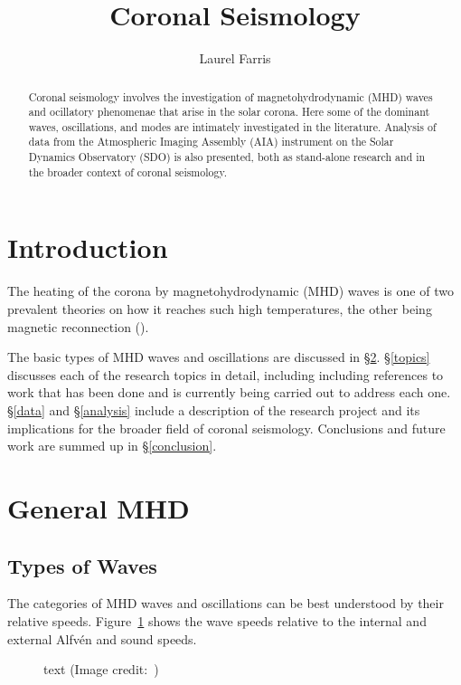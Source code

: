 \documentclass[preprint2]{aastex}
\begin{document}
\title{\vspace{-0.75in}Coronal Seismology}
\author{\vspace{-0.25in}Laurel Farris}

\begin{abstract}
Coronal seismology involves the investigation of magnetohydrodynamic
(MHD) waves and
ocillatory phenomenae that arise in the solar corona. Here some of the
dominant waves, oscillations, and modes are intimately investigated in
the literature. Analysis of data from the Atmospheric Imaging
Assembly (AIA) instrument on the Solar Dynamics Observatory (SDO) is
also presented, both as stand-alone research and in the broader
context of coronal seismology.
\end{abstract}

\section{Introduction}\label{intro}
The heating of the corona by magnetohydrodynamic (MHD)
waves is one of two prevalent theories
on how it reaches such high temperatures, the other being magnetic
reconnection (\cite{acoustic_1}).

The basic types of MHD waves and oscillations are discussed in
\S\ref{MHD}.
\S\ref{topics} discusses each of the research topics in detail,
including including references to work that has been done and is
currently being carried out to address each one.
\S\ref{data} and \S\ref{analysis}
include a description of the research project and
its implications for the broader field of coronal seismology.
Conclusions and future work are summed up in
\S\ref{conclusion}.
\section{General MHD}\label{MHD}
\subsection{Types of Waves}
The categories of MHD waves and oscillations can be best understood
by their relative speeds. Figure~\ref{speeds} shows the wave speeds relative
to the internal and external Alfv\'en and sound speeds.

\begin{figure}[ht]
    \caption{text (Image credit:~\cite{Nak})}
    \label{speeds}
\end{figure}
\end{document}
